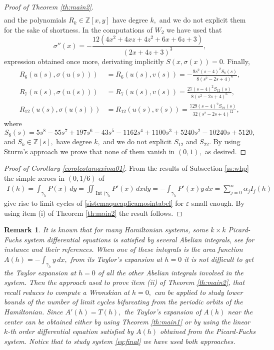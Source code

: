 \documentclass[12pt,a4paper,reqno]{amsart}
\newtheorem{rem}[teo]{Remark}
\begin{document}
\begin{proof}[Proof of Theorem \ref{th:main2}]
\begin{align*}
\end{align*}
and the polynomials $R_k\in\mathbb{Z}[x,y]$ have  degree $k,$ and we
do not explicit them for the sake of shortness. In the computations
of $W_2$ we have used that
\[
\sigma''(x)=-\frac{12(4x^2+4xz+4z^2+6x+6z+3  )}{(2x+4z+3)^3},
\]
expression obtained once more, derivating implicitly
$S(x,\sigma(x))=0.$ Finally,
\begin{align*}
R_{6}(u(s),\sigma(u(s)))&=R_{6}(u(s),v(s))=-\frac{9s^2(s-4)^2S_8(s)}
{8(s^2-2s+4)^6},\\
R_{7}(u(s),\sigma(u(s)))&=R_{7}(u(s),v(s))=\frac{27(s-4)^2S_{12}(s)}
{8(s^2-2s+4)^6},\\
R_{12}(u(s),\sigma(u(s)))&=R_{12}(u(s),v(s))=\frac{729(s-4)^2S_{22}(s)}
{32(s^2-2s+4)^{12}},
\end{align*}
where
\[
S_8(s)=5 {s}^{8}-55 {s}^{7}+197 {s}^{6}-43 {s} ^{5}-1162
{s}^{4}+1100 {s}^{3}+5240 {s}^{2}-10240 s+5120,
\]
and  $S_k\in\mathbb{Z}[s],$ have degree $k,$ and we do not explicit
$S_{12}$ and $S_{22}.$ By using Sturm's approach we prove that none
of them vanish in $(0,1),$ as desired.
\end{proof}









\begin{proof}[Proof of Corollary \ref{corolcotamaxima01}] From the
results of Subsection \ref{ss:whp} the simple zeroes in $(0,1/6)$ of
\begin{align*}\label{eq:final}
I(h)=\int_{\gamma_h} P(x)\,dy=\iint_{\operatorname{Int}(\gamma_h}
P'(x)\,dxdy=-\int_{\gamma_h} P'(x) y\, dx=\sum_{j=0}^{n} \alpha_j
I_{j}(h)
\end{align*}
give rise to limit cycles of \eqref{sistemaqueaplicamosintabel} for
$\varepsilon$ small enough. By using item (i) of Theorem
\ref{th:main2} the result follows.
\end{proof}

\begin{rem}\label{re:final}
It is known that for many Hamiltonian systems, some $k\times k$
Picard-Fuchs system differential equations is satisfied by several
Abelian integrals, see for instance \cite{NovYak2001} and their
references. When one of these integrals is the area function
$A(h)=-\int_{\gamma_h} y\,dx,$
 from its Taylor's expansion at $h=0$ it is not difficult to get
  the Taylor expansion at $h=0$ of all the other Abelian integrals involved in the system.
  Then the approach used to prove item (ii) of Theorem \ref{th:main2}, that recall reduces to compute
  a Wronskian at $h=0,$ can be applied to
study lower bounds of the number of limit cycles bifurcating from
the periodic orbits of the Hamiltonian. Since $A'(h)=T(h),$ the
Taylor's expansion of $A(h)$ near the center can be obtained either
by using Theorem \ref{th:main1} or by using the linear $k$-th order
differential equation satisfied by $A(h)$ obtained from the
Picard-Fuchs system. Notice that to study system \eqref{eq:final} we
have used both approaches.
\end{rem}
\end{document}
